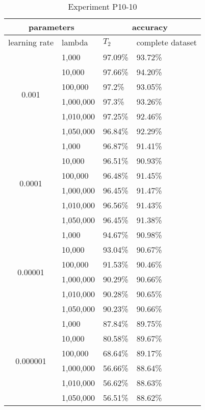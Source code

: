 \begin{table}[H]
    \centering
    \begin{tabular}{ |c|l|l|l|  }
        \hline
        \multicolumn{2}{|c|}{parameters} & \multicolumn{2}{c|}{accuracy} \\
        \hline
        learning rate & lambda & $T_2$ & complete dataset\\
        \hline
        \hline
        \multirow{6}{*}{0.001} & 1,000 & 97.09\% & 93.72\%\\
                            & 10,000 & 97.66\% & 94.20\%\\
                            & 100,000 & 97.2\% & 93.05\% \\
                            & 1,000,000 & 97.3\% & 93.26\% \\
                            & 1,010,000 & 97.25\% & 92.46\% \\
                            & 1,050,000 & 96.84\% & 92.29\% \\
        \hline
        \multirow{6}{*}{0.0001} & 1,000 & 96.87\% & 91.41\%\\
                                & 10,000 & 96.51\% & 90.93\%\\
                                & 100,000 & 96.48\% & 91.45\% \\
                                & 1,000,000 & 96.45\% & 91.47\% \\
                                & 1,010,000 & 96.56\% & 91.43\% \\
                                & 1,050,000 & 96.45\% & 91.38\% \\
        \hline
        \multirow{6}{*}{0.00001} & 1,000 & 94.67\% & 90.98\%\\
                                & 10,000 & 93.04\% & 90.67\%\\
                                & 100,000 & 91.53\% & 90.46\% \\
                                & 1,000,000 & 90.29\% & 90.66\% \\
                                & 1,010,000 & 90.28\% & 90.65\% \\
                                & 1,050,000 & 90.23\% & 90.66\% \\
        \hline
        \multirow{6}{*}{0.000001} & 1,000 & 87.84\% & 89.75\% \\
                                & 10,000 & 80.58\% & 89.67\% \\
                                & 100,000 & 68.64\% & 89.17\% \\
                                & 1,000,000 & 56.66\% & 88.64\% \\
                                & 1,010,000 & 56.62\% & 88.63\% \\
                                & 1,050,000 & 56.51\% & 88.62\% \\
        \hline
    \end{tabular}
    \caption{Experiment P10-10}
    \label{table:exp_d10-10}
\end{table}
